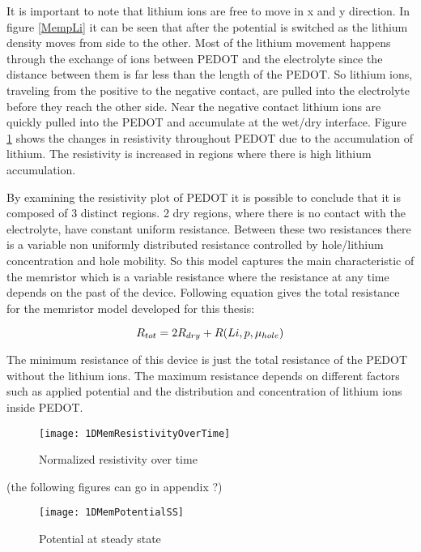 {It is important to note that lithium ions are free to move in x and y direction. In figure \ref{MempLi} it can be seen that after the potential is switched as the lithium density moves from  side to the other. Most of the lithium movement happens through the exchange of ions between PEDOT and the electrolyte since the distance between them is far less than the length of the PEDOT. So lithium ions, traveling from the positive to the negative contact, are pulled into the electrolyte before they reach the other side. Near the negative contact lithium ions are quickly pulled into the PEDOT and accumulate at the wet/dry interface. Figure \ref{MemResistivityTrain} shows the changes in resistivity throughout PEDOT due to the accumulation of lithium. The resistivity is increased in regions where there is high lithium accumulation. 

By examining the resistivity plot of PEDOT it is possible to conclude that it is composed of 3 distinct regions. 2 dry regions, where there is no contact with the electrolyte, have constant uniform resistance. Between these two resistances there is a variable non uniformly distributed resistance controlled by hole/lithium concentration and hole mobility. So this model captures the main characteristic of the memristor which is a variable resistance where the resistance at any time depends on the past of the device. Following equation gives the total resistance for the memristor model developed for this thesis:

\begin{equation}
\centering
R_{tot}=2R_{dry}+R(Li,p,\mu_{hole})
\end{equation}

The minimum resistance of this device is just the total resistance of the PEDOT without the lithium ions. The maximum resistance depends on different factors such as applied potential and the distribution and concentration of lithium ions inside PEDOT.

\begin{figure}[!htp]
\centering
\texttt{[image: 1DMemResistivityOverTime]}
\caption{Normalized resistivity over time} 
\label{MemResistivityTrain}
\end{figure}



\clearpage
(the following figures can go in appendix ?)


\begin{figure}[!htp]
\centering
\texttt{[image: 1DMemPotentialSS]}
\caption{Potential at steady state} 
\label{MemVss}
\end{figure}


}
